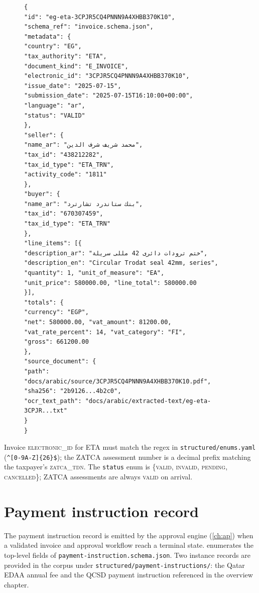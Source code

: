\documentclass[11pt,a4paper,twoside]{report}
\newcommand{\corpus}{}
\begin{document}
\begin{figure}[htbp]
\begin{lstlisting}[language=jsonx,caption={Full invoice record for the
Egypt ETA seal invoice (\texttt{eg-eta-3CPJR5CQ4PNNN9A4XHBB370K10}).
Arabic strings are UTF-8; the LaTeX engine renders them RTL.},
label=lst:invoice-example]
{
"id": "eg-eta-3CPJR5CQ4PNNN9A4XHBB370K10",
"schema_ref": "invoice.schema.json",
"metadata": {
"country": "EG",
"tax_authority": "ETA",
"document_kind": "E_INVOICE",
"electronic_id": "3CPJR5CQ4PNNN9A4XHBB370K10",
"issue_date": "2025-07-15",
"submission_date": "2025-07-15T16:10:00+00:00",
"language": "ar",
"status": "VALID"
},
"seller": {
"name_ar": "محمد شريف شرف الدين",
"tax_id": "438212282",
"tax_id_type": "ETA_TRN",
"activity_code": "1811"
},
"buyer": {
"name_ar": "بنك ستاندرد تشارترد",
"tax_id": "670307459",
"tax_id_type": "ETA_TRN"
},
"line_items": [{
"description_ar": "ختم ترودات دائرى 42 مللى سريلة",
"description_en": "Circular Trodat seal 42mm, series",
"quantity": 1, "unit_of_measure": "EA",
"unit_price": 580000.00, "line_total": 580000.00
}],
"totals": {
"currency": "EGP",
"net": 580000.00, "vat_amount": 81200.00,
"vat_rate_percent": 14, "vat_category": "FI",
"gross": 661200.00
},
"source_document": {
"path": "docs/arabic/source/3CPJR5CQ4PNNN9A4XHBB370K10.pdf",
"sha256": "2b9126...4b2c0",
"ocr_text_path": "docs/arabic/extracted-text/eg-eta-3CPJR...txt"
}
}
\end{lstlisting}
\end{figure}

Invoice \textsc{electronic\_id} for ETA must match the regex in
\corpus\texttt{structured/enums.yaml}
(\verb|^[0-9A-Z]{26}$|); the ZATCA assessment number is a decimal prefix
matching the taxpayer's \textsc{zatca\_tdn}. The \texttt{status} enum is
\{\textsc{valid}, \textsc{invalid}, \textsc{pending}, \textsc{cancelled}\};
ZATCA assessments are always \textsc{valid} on arrival.

\section{Payment instruction record}
\label{sec:payment-instruction-schema}

The payment instruction record is emitted by the approval engine
(\cref{ch:ap}) when a validated invoice and approval workflow reach a
terminal state.  enumerates the
top-level fields of \texttt{payment-instruction.schema.json}. Two
instance records are provided in the corpus under
\texttt{structured/payment-instructions/}: the Qatar EDAA annual fee
and the QCSD payment instruction referenced in the overview chapter.
\end{document}
